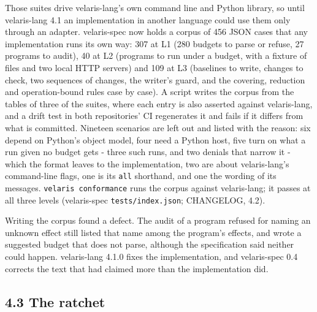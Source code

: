 \documentclass[
]{article}
\begin{document}
Those suites drive velaris-lang's own command line and Python library,
so until velaris-lang 4.1 an implementation in another language could
use them only through an adapter. velaris-spec now holds a corpus of 456
JSON cases that any implementation runs its own way: 307 at L1 (280
budgets to parse or refuse, 27 programs to audit), 40 at L2 (programs to
run under a budget, with a fixture of files and two local HTTP servers)
and 109 at L3 (baselines to write, changes to check, two sequences of
changes, the writer's guard, and the covering, reduction and
operation-bound rules case by case). A script writes the corpus from the
tables of three of the suites, where each entry is also asserted against
velaris-lang, and a drift test in both repositories' CI regenerates it
and fails if it differs from what is committed. Nineteen scenarios are
left out and listed with the reason: six depend on Python's object
model, four need a Python host, five turn on what a run given no budget
gets - three such runs, and two denials that narrow it - which the
format leaves to the implementation, two are about velaris-lang's
command-line flags, one is its \texttt{all} shorthand, and one the
wording of its messages. \texttt{velaris\ conformance} runs the corpus
against velaris-lang; it passes at all three levels (velaris-spec
\texttt{tests/index.json}; CHANGELOG, 4.2).

Writing the corpus found a defect. The audit of a program refused for
naming an unknown effect still listed that name among the program's
effects, and wrote a suggested budget that does not parse, although the
specification said neither could happen. velaris-lang 4.1.0 fixes the
implementation, and velaris-spec 0.4 corrects the text that had claimed
more than the implementation did.

\subsection{4.3 The ratchet}\label{the-ratchet-1}
\end{document}

